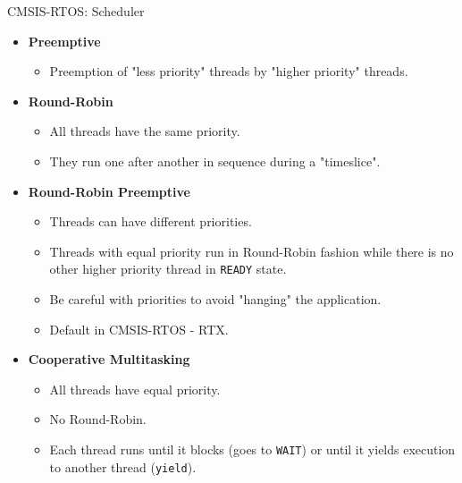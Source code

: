 \begin{frame}{CMSIS-RTOS: Scheduler}
    \begin{itemize}
      \item \textbf{Preemptive}
          \begin{itemize}
            \item Preemption of "less priority" threads by "higher priority" threads.
          \end{itemize}
      \item \textbf{Round-Robin}
          \begin{itemize}
            \item All threads have the same priority.
            \item They run one after another in sequence during a "timeslice".
      \end{itemize}
      \item \textbf{Round-Robin Preemptive}
          \begin{itemize}
            \item Threads can have different priorities.
            \item Threads with equal priority run in Round-Robin fashion while there is no other higher priority thread in \texttt{READY} state.
            \item Be careful with priorities to avoid "hanging" the application.
            \item Default in CMSIS-RTOS - RTX.
      \end{itemize}
      \item \textbf{Cooperative Multitasking}
          \begin{itemize}
            \item All threads have equal priority.
            \item No Round-Robin.
            \item Each thread runs until it blocks (goes to \texttt{WAIT}) or until it yields execution to another thread (\texttt{yield}).
          \end{itemize}
    \end{itemize}
\end{frame}

